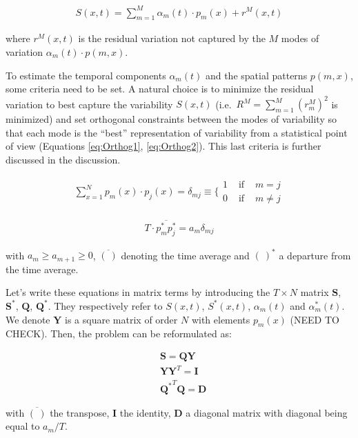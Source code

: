 \documentclass[
  english,
  man]{apa6}
\begin{document}
\begin{align} \label{eq:EOF}
S(x,t)=\sum_{m=1}^M \alpha_m(t) \cdot p_m(x) + r^M(x,t)
\end{align}

where \(r^M(x,t)\) is the residual variation not captured by the \(M\) modes of variation \(\alpha_m(t) \cdot p(m,x)\).

To estimate the temporal components \(\alpha_m(t)\) and the spatial patterns \(p(m,x)\), some criteria need to be set. A natural choice is to minimize the residual variation to best capture the variability \(S(x,t)\) (i.e.~\(R^M=\sum^M_{m=1}(r^M_m)^2\) is minimized) and set orthogonal constraints between the modes of variability so that each mode is the \enquote{best} representation of variability from a statistical point of view (Equations \ref{eq:Orthog1}, \ref{eq:Orthog2}). This last criteria is further discussed in the discussion.

\begin{align}
\label{eq:Orthog1}
\sum^N_{x=1} p_m(x) \cdot p_j(x) = \delta_{mj} \equiv \Bigg \{ \begin{array}{lll}1 & \text { if } & m=j \\ 0 & \text { if } & m \neq j\end{array}
\end{align}

\begin{align}
\label{eq:Orthog2}
T \cdot \overline{p_m^* p_j^*} = a_m \delta_{mj}
\end{align}

with \(a_m \geq a_{m+1} \geq 0\), \(\overline{( \ )}\) denoting the time average and \(( \ )^*\) a departure from the time average.

Let's write these equations in matrix terms by introducing the \(T \times N\) matrix \(\mathbf{S}\), \(\mathbf{S}^*\), \(\mathbf{Q}\), \(\mathbf{Q}^*\). They respectively refer to \(S(x,t)\), \(S^*(x,t)\), \(\alpha_m(t)\) and \(\alpha_m^*(t)\). We denote \(\mathbf{Y}\) is a square matrix of order \(N\) with elements \(p_{m}(x)\) (NEED TO CHECK). Then, the problem can be reformulated as:

\begin{align}
& \mathbf{S}=\mathbf{QY} \\
& \mathbf{YY}^T=\mathbf{I} \\
& {\mathbf{Q}^{*}}^T\mathbf{Q} = \mathbf{D}
\end{align}

with \(\overline{(\ )}\) the transpose, \(\mathbf{I}\) the identity, \(\mathbf{D}\) a diagonal matrix with diagonal being equal to \(a_m / T\).
\end{document}
